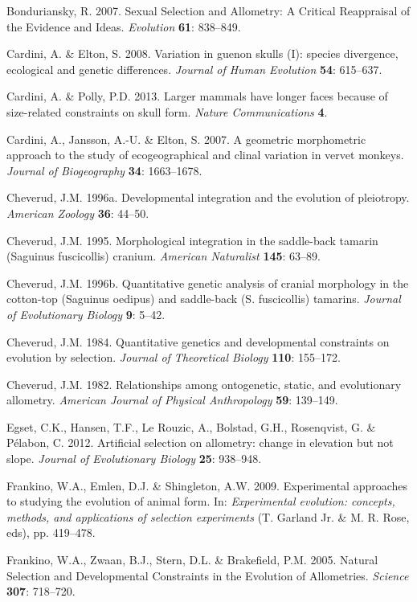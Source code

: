\documentclass[12pt,]{article}
\begin{document}
Bonduriansky, R. 2007. Sexual Selection and Allometry: A Critical
Reappraisal of the Evidence and Ideas. \emph{Evolution} \textbf{61}:
838--849.

Cardini, A. \& Elton, S. 2008. Variation in guenon skulls (I): species
divergence, ecological and genetic differences. \emph{Journal of Human
Evolution} \textbf{54}: 615--637.

Cardini, A. \& Polly, P.D. 2013. Larger mammals have longer faces
because of size-related constraints on skull form. \emph{Nature
Communications} \textbf{4}.

Cardini, A., Jansson, A.-U. \& Elton, S. 2007. A geometric morphometric
approach to the study of ecogeographical and clinal variation in vervet
monkeys. \emph{Journal of Biogeography} \textbf{34}: 1663--1678.

Cheverud, J.M. 1996a. Developmental integration and the evolution of
pleiotropy. \emph{American Zoology} \textbf{36}: 44--50.

Cheverud, J.M. 1995. Morphological integration in the saddle-back
tamarin (Saguinus fuscicollis) cranium. \emph{American Naturalist}
\textbf{145}: 63--89.

Cheverud, J.M. 1996b. Quantitative genetic analysis of cranial
morphology in the cotton-top (Saguinus oedipus) and saddle-back (S.
fuscicollis) tamarins. \emph{Journal of Evolutionary Biology}
\textbf{9}: 5--42.

Cheverud, J.M. 1984. Quantitative genetics and developmental constraints
on evolution by selection. \emph{Journal of Theoretical Biology}
\textbf{110}: 155--172.

Cheverud, J.M. 1982. Relationships among ontogenetic, static, and
evolutionary allometry. \emph{American Journal of Physical Anthropology}
\textbf{59}: 139--149.

Egset, C.K., Hansen, T.F., Le Rouzic, A., Bolstad, G.H., Rosenqvist, G.
\& Pélabon, C. 2012. Artificial selection on allometry: change in
elevation but not slope. \emph{Journal of Evolutionary Biology}
\textbf{25}: 938--948.

Frankino, W.A., Emlen, D.J. \& Shingleton, A.W. 2009. Experimental
approaches to studying the evolution of animal form. In:
\emph{Experimental evolution: concepts, methods, and applications of
selection experiments} (T. Garland Jr. \& M. R. Rose, eds), pp.
419--478.

Frankino, W.A., Zwaan, B.J., Stern, D.L. \& Brakefield, P.M. 2005.
Natural Selection and Developmental Constraints in the Evolution of
Allometries. \emph{Science} \textbf{307}: 718--720.
\end{document}
